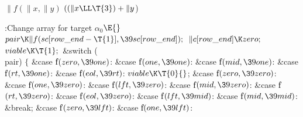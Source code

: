 \Y\B\4\D$\|f(\|x,\|y)$ \5
$((\|x\LL\T{3})+\|y{}$)\par
\Y\B\4:Change array  for target $\alpha_0$\X${}\E{}$\6
$\\{pair}\K\|f(\\{sc}[\\{row\_end}-\T{1}],\39\\{sc}[\\{row\_end}]);{}$\6
${}\|c[\\{row\_end}]\K\\{zero};{}$\6
${}\\{viable}\K\T{1};{}$\6
\&{switch} (\\{pair})\5
${}\{{}$\1\6
\4\&{case} \|f${}(\\{zero},\39\\{one}){}$:\5
\&{case} \|f${}(\\{one},\39\\{one}){}$:\5
\&{case} \|f${}(\\{mid},\39\\{one}){}$:\5
\&{case} \|f${}(\\{rt},\39\\{one}){}$:\5
\&{case} \|f${}(\\{eol},\39\\{rt}){}$:\5
${}\\{viable}\K\T{0}{}$;\6
\4\&{case} \|f${}(\\{zero},\39\\{zero}){}$:\5
\&{case} \|f${}(\\{one},\39\\{zero}){}$:\5
\&{case} \|f${}(\\{lft},\39\\{zero}){}$:\5
\&{case} \|f${}(\\{mid},\39\\{zero}){}$:\5
\&{case} \|f${}(\\{rt},\39\\{zero}){}$:\5
\&{case} \|f${}(\\{eol},\39\\{zero}){}$:\5
\&{case} \|f${}(\\{lft},\39\\{mid}){}$:\5
\&{case} \|f${}(\\{mid},\39\\{mid}){}$:\5
\&{break};\6
\4\&{case} \|f${}(\\{zero},\39\\{lft}){}$:\5
\&{case} \|f${}(\\{one},\39\\{lft}){}$:\5
